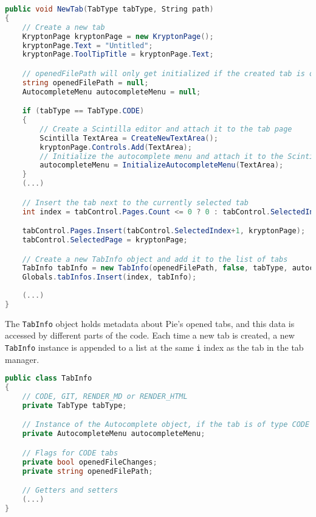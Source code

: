 \begin{lstlisting}[language=csharp, caption={Implementation of the NewTab() method for CODE tabs}]
public void NewTab(TabType tabType, String path)
{
    // Create a new tab
    KryptonPage kryptonPage = new KryptonPage();
    kryptonPage.Text = "Untitled";
    kryptonPage.ToolTipTitle = kryptonPage.Text;

    // openedFilePath will only get initialized if the created tab is of RENDER\_* type
    string openedFilePath = null;
    AutocompleteMenu autocompleteMenu = null;

    if (tabType == TabType.CODE)
    {
        // Create a Scintilla editor and attach it to the tab page
        Scintilla TextArea = CreateNewTextArea();
        kryptonPage.Controls.Add(TextArea);
        // Initialize the autocomplete menu and attach it to the Scintilla editor
        autocompleteMenu = InitializeAutocompleteMenu(TextArea);
    }
    (...)

    // Insert the tab next to the currently selected tab
    int index = tabControl.Pages.Count <= 0 ? 0 : tabControl.SelectedIndex+1;

    tabControl.Pages.Insert(tabControl.SelectedIndex+1, kryptonPage);
    tabControl.SelectedPage = kryptonPage;

    // Create a new TabInfo object and add it to the list of tabs
    TabInfo tabInfo = new TabInfo(openedFilePath, false, tabType, autocompleteMenu);
    Globals.tabInfos.Insert(index, tabInfo);
    
    (...)
}
\end{lstlisting}

The \texttt{TabInfo} object holds metadata about Pie's opened tabs, and this data is accessed by different parts of the code. Each time a new tab is created, a new \texttt{TabInfo} instance is appended to a list at the same \texttt{i} index as the tab in the tab manager.

\begin{lstlisting}[language=csharp, caption={Structure of the TabInfo class}]
public class TabInfo
{
    // CODE, GIT, RENDER_MD or RENDER_HTML
    private TabType tabType;

    // Instance of the Autocomplete object, if the tab is of type CODE
    private AutocompleteMenu autocompleteMenu;

    // Flags for CODE tabs
    private bool openedFileChanges;
    private string openedFilePath;

    // Getters and setters
    (...)
}
\end{lstlisting}

